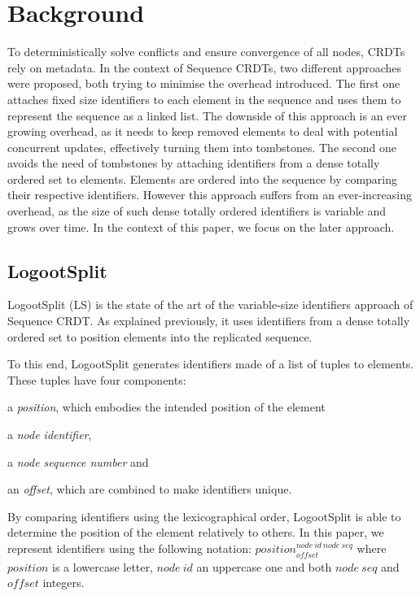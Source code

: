 \documentclass[10pt,journal,compsoc]{IEEEtran}
\newcommand{\trm}[1]{\mathit{#1}}
\newcommand{\id}[3]{$\trm{#1}^{\trm{#2}}_{\trm{#3}}$}
\begin{document}

\section{Background}
\label{sec:background}

To deterministically solve conflicts and ensure convergence of all nodes, \acp{CRDT} rely on metadata.
In the context of Sequence \acp{CRDT}, two different approaches were proposed, both trying to minimise the overhead introduced.
The first one \cite{oster:inria-00108523, ROH2011354,briot:hal-01343941} attaches fixed size identifiers to each element in the sequence and uses them to represent the sequence as a linked list.
The downside of this approach is an ever growing overhead, as it needs to keep removed elements to deal with potential concurrent updates, effectively turning them into tombstones.
The second one \cite{5158449,WeissICDCS09,weiss:hal-00450416,AndreCollaborateCom2013,nedelec_2013_lseq,doi:10.1002/cpe.4108} avoids the need of tombstones by attaching identifiers from a dense totally ordered set to elements.
Elements are ordered into the sequence by comparing their respective identifiers.
However this approach suffers from an ever-increasing overhead, as the size of such dense totally ordered identifiers is variable and grows over time.
In the context of this paper, we focus on the later approach.


\subsection{LogootSplit}

LogootSplit (LS) \cite{AndreCollaborateCom2013} is the state of the art of the variable-size identifiers approach of Sequence \ac{CRDT}.
As explained previously, it uses identifiers from a dense totally ordered set to position elements into the replicated sequence.

To this end, LogootSplit generates identifiers made of a list of tuples to elements.
These tuples have four components:
\begin{enumerate*}
    \item a \emph{position}, which embodies the intended position of the element
    \item a \emph{node identifier},
    \item a \emph{node sequence number} and
    \item an \emph{offset}, which are combined to make identifiers unique.
\end{enumerate*}
By comparing identifiers using the lexicographical order, LogootSplit is able to determine the position of the element relatively to others.
In this paper, we represent identifiers using the following notation: \id{position}{node~id~node~seq}{offset} where $\trm{position}$ is a lowercase letter, $\trm{node~id}$ an uppercase one and both $\trm{node~seq}$ and $\trm{offset}$ integers.
\end{document}
